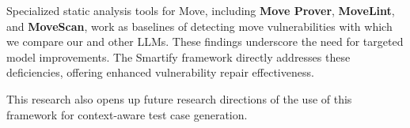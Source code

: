 Specialized static analysis tools for Move, including \textbf{Move Prover}, \textbf{MoveLint}, and \textbf{MoveScan}, work as baselines of detecting move vulnerabilities with which we compare our \sln{} and other LLMs. These findings underscore the need for targeted model improvements. The Smartify framework directly addresses these deficiencies, offering enhanced vulnerability repair effectiveness. 

This research also opens up future research directions of the use of this framework for context-aware test case generation.